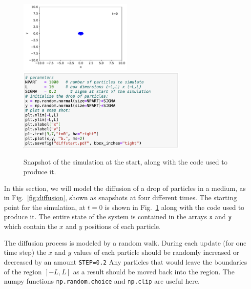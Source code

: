 \begin{figure}[htbp]
 \begin{center}
  \includegraphics[width=0.50\textwidth]{figs/monte_carlo/diffstart.pdf}
  \includegraphics[width=0.75\textwidth]{figs/monte_carlo/diffstart-code.png}
  \caption{Snapshot of the simulation at the start, along with the code used to produce it.}
\label{fig:diffstart}
\end{center}
\end{figure}


\noindent
In this section, we will model the diffusion of a drop of particles in
a medium, as in Fig.~\ref{fig:diffusion}, shown as snapshots at four
different times.  The starting point for the simulation, at $t=0$ is
shown in Fig.~\ref{fig:diffstart} along with the code used to produce
it.  The entire state of the system is contained in the arrays {\tt x}
and {\tt y} which contain the $x$ and $y$ positions of each particle.

The diffusion process is modeled by a random walk. During each update
(for one time step) the $x$ and $y$ values of each particle should be
randomly increased or decreased by an amount {\tt STEP=0.2} Any
particles that would leave the boundaries of the region $[-L,L]$ as a
result should be moved back into the region.  The numpy functions 
{\tt np.random.choice} and {\tt np.clip} are useful here.

